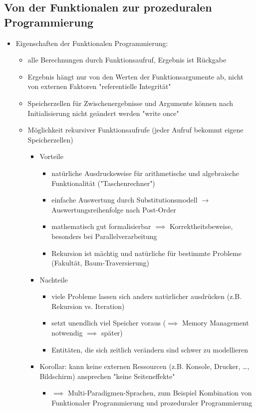 \documentclass[a4paper]{scrartcl}
\theoremstyle{definition}
\theoremstyle{plain}
\theoremstyle{remark}
\theoremstyle{remark}
\begin{document}
\subsection{Von der Funktionalen zur prozeduralen Programmierung}
\label{sec-7-1}
\begin{itemize}
\item Eigenschaften der Funktionalen Programmierung:
\begin{itemize}
\item alle Berechnungen durch Funktionsaufruf, Ergebnis ist Rückgabe
\item Ergebnis hängt nur von den Werten der Funktionsargumente ab, nicht von externen Faktoren "referentielle Integrität"
\item Speicherzellen für Zwischenergebnisse und Argumente können nach Initialisierung nicht geändert werden "write once"
\item Möglichkeit rekursiver Funktionsaufrufe (jeder Aufruf bekommt eigene Speicherzellen)
\begin{itemize}
\item Vorteile
\begin{itemize}
\item natürliche Ausdrucksweise für arithmetische und algebraische Funktionalität ("Taschenrechner")
\item einfache Auswertung durch Substitutionsmodell $\rightarrow$ Auswertungsreihenfolge nach Post-Order
\item mathematisch gut formalisierbar $\implies$ Korrektheitsbeweise, besonders bei Parallelverarbeitung
\item Rekursion ist mächtig und natürliche für bestimmte Probleme (Fakultät, Baum-Traversierung)
\end{itemize}
\item Nachteile
\begin{itemize}
\item viele Probleme lassen sich anders natürlicher ausdrücken (z.B. Rekursion vs. Iteration)
\item setzt unendlich viel Speicher voraus ($\implies$ Memory Management notwendig $\implies$ später)
\item Entitäten, die sich zeitlich verändern sind schwer zu modellieren
\end{itemize}
\item Korollar: kann keine externen Ressourcen (z.B. Konsole, Drucker, \ldots, Bildschirm) ansprechen "keine Seiteneffekte"
\begin{itemize}
\item $\implies$ Multi-Paradigmen-Sprachen, zum Beispiel Kombination von Funktionaler Programmierung und prozeduraler Programmierung
\end{itemize}
\end{itemize}
\end{itemize}
\end{itemize}
\end{document}
